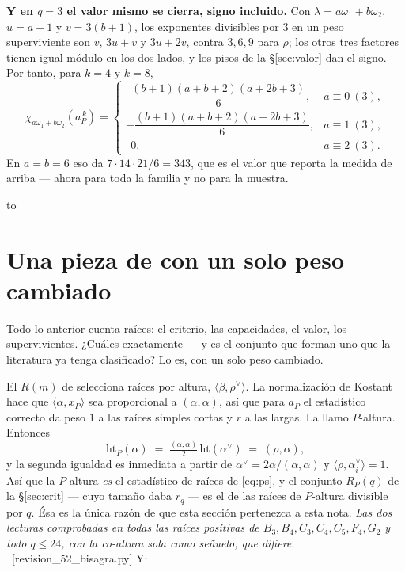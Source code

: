 \documentclass[11pt,a4paper]{article}
\newcommand{\hgt}{\mathrm{ht}}
\newcommand{\rhoh}{\rho^{\vee}}
\newcommand{\ver}[1]{\unskip\penalty0\ \textcolor{azul}{\small\textsf{[#1]}}}
\newenvironment{keybox}
  {\par\vspace{9pt}\begin{lrbox}{\fichabox}%
   \begin{minipage}{0.90\textwidth}\vspace{7pt}\setlength{\parskip}{3pt}}
  {\vspace{7pt}\end{minipage}\end{lrbox}%
   \par\noindent\hbox to \textwidth{\hfill
   \textcolor{azul}{\rule[-\dp\fichabox]{3.2pt}{\dimexpr\ht\fichabox+\dp\fichabox\relax}}%
   \colorbox{fondoficha}{\usebox{\fichabox}}\hfill}%
   \par\vspace{9pt}}
\begin{document}
\begin{keybox}
\textbf{Y en $q=3$ el valor mismo se cierra, signo incluido.} Con $\lambda=a\omega_1+b\omega_2$,
$u=a+1$ y $v=3(b+1)$, los exponentes divisibles por $3$ en un peso superviviente son $v$, $3u+v$ y
$3u+2v$, contra $3,6,9$ para $\rho$; los otros tres factores tienen igual módulo en los dos lados, y
los pisos de la \S\ref{sec:valor} dan el signo. Por tanto, para $k=4$ y $k=8$,
\[
\chi_{a\omega_1+b\omega_2}(a_P^{\,k})=
\begin{cases}
\ \ \dfrac{(b+1)(a+b+2)(a+2b+3)}{6}, & a\equiv0 \ (3),\\[3mm]
-\dfrac{(b+1)(a+b+2)(a+2b+3)}{6}, & a\equiv1 \ (3),\\[3mm]
\ \ 0, & a\equiv2 \ (3).
\end{cases}
\]
En $a=b=6$ eso da $7\cdot14\cdot21/6=343$, que es el valor que reporta la medida de arriba --- ahora
para toda la familia y no para la muestra.
\end{keybox}


\section{Una pieza de \cite{NPP25} con un solo peso cambiado}\label{sec:types}

\noindent Todo lo anterior cuenta raíces: el criterio, las capacidades, el valor, los
supervivientes. ¿Cuáles exactamente --- y es el conjunto que forman uno que la literatura ya
tenga clasificado? Lo es, con un solo peso cambiado.

El $R(m)$ de \cite{NPP25} selecciona raíces por altura, $\langle\beta,\rhoh\rangle$. La normalización de Kostant hace
que $\langle\alpha,x_P\rangle$ sea proporcional a $(\alpha,\alpha)$, así que para $a_P$ el estadístico
correcto da peso $1$ a las raíces simples cortas y $r$ a las largas. La llamo $P$-altura. Entonces
\[
\hgt_P(\alpha) \;=\; \tfrac{(\alpha,\alpha)}{2}\,\hgt(\alpha^\vee) \;=\; (\rho,\alpha),
\]
y la segunda igualdad es inmediata a partir de $\alpha^\vee=2\alpha/(\alpha,\alpha)$ y
$\langle\rho,\alpha_i^\vee\rangle=1$. Así que la $P$-altura \emph{es} el estadístico de raíces de
\eqref{eq:ps}, y el conjunto $R_P(q)$ de la \S\ref{sec:crit} --- cuyo tamaño daba $r_q$ --- es el de
las raíces de $P$-altura divisible por $q$. Ésa es la única razón de que esta sección pertenezca a
esta nota. \emph{Las dos lecturas comprobadas en todas las raíces positivas de
$B_3,B_4,C_3,C_4,C_5,F_4,G_2$ y todo $q\le24$, con la co-altura sola como señuelo, que difiere.}
\ver{revision\_52\_bisagra.py} Y:
\end{document}
